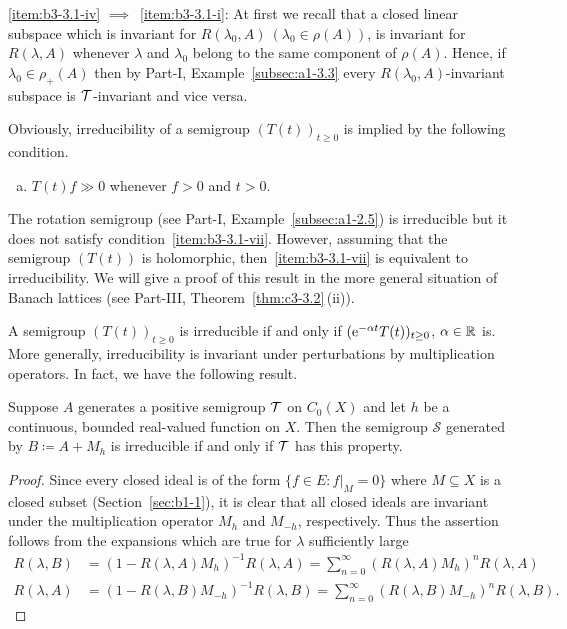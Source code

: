 \ref{item:b3-3.1-iv} $\implies$~\ref{item:b3-3.1-i}: At first we recall that a closed linear subspace which is invariant for $R(\lambda_0,A)\ (\lambda_0 \in \rho(A))$, is invariant for $R(\lambda ,A)$
whenever $\lambda$ and $\lambda_0$ belong to the same component of\/ $\rho(A)$. 
Hence, if\/ $\lambda_0 \in \rho_{+}(A)$ then by Part-I, Example~\ref{subsec:a1-3.3} every $R(\lambda_0,A)$-invariant subspace is $\mathcal{T}$-invariant and vice versa.
\begin{remark}\label{rem:b3-3.2}
	Obviously, irreducibility of a semigroup $(T(t))_{t\geq 0}$ is implied by the following condition.
\begin{enumerate}[(g)]	
\item\label{item:b3-3.1-vii}
$T(t)f \gg 0$ whenever $f > 0$ and $t > 0$.
\end{enumerate}
The rotation semigroup (see Part-I, Example~\ref{subsec:a1-2.5}) is irreducible but it does not satisfy condition~\ref{item:b3-3.1-vii}.
	However, assuming that the semigroup $(T(t))$ is holomorphic, then~\ref{item:b3-3.1-vii}
	is equivalent to irreducibility.
	We will give a proof of this result in the more general situation of Banach lattices (see Part-III, Theorem~\ref{thm:c3-3.2}\,(ii)).
\end{remark}
A semigroup $(T(t))_{t  \geq 0}$ is irreducible if and only if\/ $(\eu^{-\alpha t}T(t))_{t  \geq 0}$, $\alpha \in \mathbb{R}$  is. 
More generally, irreducibility is invariant under perturbations by multiplication operators. 
In fact, we have the following result. 
\begin{proposition}\label{prop:b3-3.3}
%
	Suppose $A$ generates a positive semigroup $\mathcal{T}$ on $C_{0}(X)$ and let $h$ be a continuous, bounded real-valued function on $X$.
	Then the semigroup $\mathcal{S}$ generated by $B \coloneq A + M_{h}$ is irreducible if and only if\/ $\mathcal{T}$ has this property.
\end{proposition}
\begin{proof}
	Since every closed ideal is of the form $\{f \in E \colon f|_{M} = 0\}$ where $M \subseteq X$ is a closed subset (\cf Section~\ref{sec:b1-1}), it is clear that all closed ideals are invariant under the multiplication operator $M_{h}$ and $M_{-h}$, respectively.
	Thus the assertion follows from the expansions which are true for $\lambda$ sufficiently large
\begin{align*}
R(\lambda,B) &= (1 - R(\lambda,A)M_{h})^{-1}R(\lambda,A) 
	= \sum_{n=0}^{\infty} (R(\lambda,A)M_{h})^{n}R(\lambda,A) \\
R(\lambda,A) &= (1 - R(\lambda,B)M_{-h})^{-1}R(\lambda,B) = \sum_{n=0}^{\infty} (R(\lambda,B)M_{-h})^{n}R(\lambda,B).
\tag*{\qedsymbol}%
\end{align*} 
\let\qedsymbol\relax
\end{proof}
